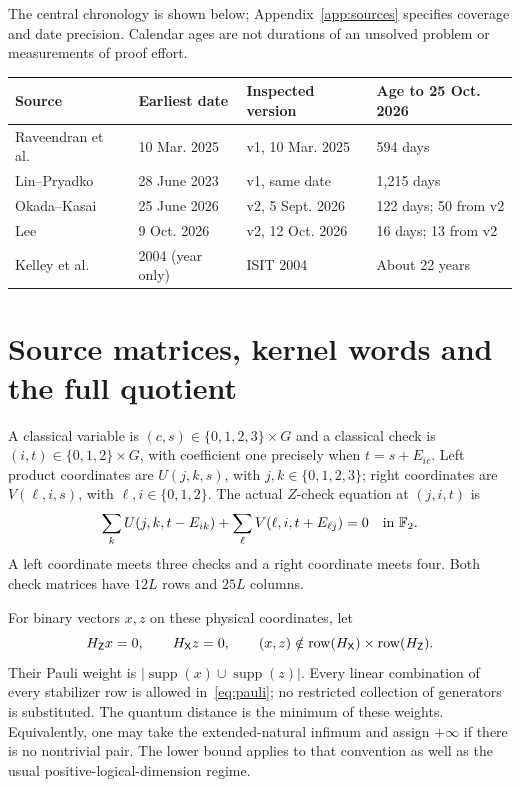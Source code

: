 \documentclass[11pt]{article}
\theoremstyle{definition}\newtheorem{definition}[theorem]{Definition}
\newcommand{\F}{\mathbb F_2}\newcommand{\Z}{\mathbb Z}
\newcommand{\HX}{H_{\mathsf X}}\newcommand{\HZ}{H_{\mathsf Z}}
\newcommand{\supp}{\operatorname{supp}}
\begin{document}
The central chronology is shown below; Appendix~\ref{app:sources} specifies
coverage and date precision. Calendar ages are not durations of an unsolved
problem or measurements of proof effort.
\begin{center}\small
\begin{tabular}{@{}P{.25\textwidth}P{.20\textwidth}P{.23\textwidth}P{.23\textwidth}@{}}
\toprule Source & Earliest date & Inspected version & Age to 25 Oct. 2026\\\midrule
Raveendran et al.~\cite{RDV} & 10 Mar. 2025 & v1, 10 Mar. 2025 & 594 days\\
Lin--Pryadko~\cite{LP} & 28 June 2023 & v1, same date & 1,215 days\\
Okada--Kasai~\cite{OK} & 25 June 2026 & v2, 5 Sept. 2026 & 122 days; 50 from v2\\
Lee~\cite{Lee} & 9 Oct. 2026 & v2, 12 Oct. 2026 & 16 days; 13 from v2\\
Kelley et al.~\cite{Kelley} & 2004 (year only) & ISIT 2004 & About 22 years\\
\bottomrule\end{tabular}
\end{center}

\section{Source matrices, kernel words and the full quotient}\label{sec:model}
A classical variable is $(c,s)\in\{0,1,2,3\}\times G$ and a classical check is
$(i,t)\in\{0,1,2\}\times G$, with coefficient one precisely when
$t=s+E_{ic}$. Left product coordinates are $U(j,k,s)$, with $j,k\in\{0,1,2,3\}$;
right coordinates are $V(\ell,i,s)$, with $\ell,i\in\{0,1,2\}$. The actual
$Z$-check equation at $(j,i,t)$ is
\begin{equation}\label{eq:syndrome}
 \sum_k U(j,k,t-E_{ik})+\sum_\ell V(\ell,i,t+E_{\ell j})=0\quad\hbox{in }\F.
\end{equation}
A left coordinate meets three checks and a right coordinate meets four.
Both check matrices have $12L$ rows and $25L$ columns.

For binary vectors $x,z$ on these physical coordinates, let
\begin{equation}\label{eq:pauli}
 \HZ x=0,\qquad \HX z=0,\qquad
 (x,z)\notin\row(\HX)\times\row(\HZ).
\end{equation}
Their Pauli weight is $|\supp(x)\cup\supp(z)|$. Every linear combination of
every stabilizer row is allowed in~\eqref{eq:pauli}; no restricted collection
of generators is substituted. The quantum distance is the minimum of these
weights. Equivalently, one may take the extended-natural infimum and assign
$+\infty$ if there is no nontrivial pair. The lower bound applies to that
convention as well as the usual positive-logical-dimension regime.
\end{document}
